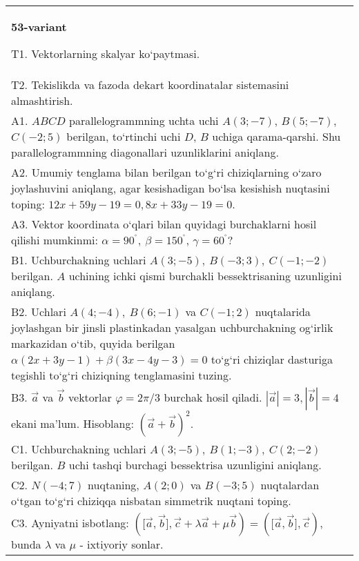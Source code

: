 \documentclass{article}
\begin{document}
\begin{tabular}{m{17cm}}
\textbf{53-variant}
\newline

T1. 
Vektorlarning skalyar ko‘paytmasi.
 \\
T2. Tekislikda va fazoda dekart koordinatalar sistemasini almashtirish.
 \\
A1. 
$ABCD$ parallelogrammning uchta uchi $A (3; -7) $,
$B (5; -7) $, $C (-2; 5) $ berilgan, to‘rtinchi uchi $D$,
$B$ uchiga qarama-qarshi. Shu parallelogrammning diagonallari
uzunliklarini aniqlang.
 \\
A2. 
Umumiy tenglama bilan berilgan to‘g‘ri chiziqlarning
o‘zaro joylashuvini aniqlang, agar kesishadigan bo‘lsa kesishish nuqtasini
toping: $12x+59y-19=0, 8x+33y-19=0$.
 \\
A3. 
Vektor koordinata o‘qlari bilan quyidagi burchaklarni hosil qilishi
mumkinmi: $\alpha = 90^{{^\circ}},\ \beta = 150^{{^\circ}}$,
$\gamma = 60^{{^\circ}}?$
 \\
B1. 
Uchburchakning uchlari
\(A (3;-5),\ B (-3;3),\ C (-1;-2) \) berilgan. $A$ uchining ichki qismi
burchakli bessektrisaning uzunligini aniqlang.
 \\
B2. 
Uchlari \(A (4;-4),\ B (6;-1) \) va \(C (-1;2) \)
nuqtalarida joylashgan bir jinsli plastinkadan yasalgan uchburchakning
og‘irlik markazidan o‘tib, quyida berilgan
\(\alpha (2x+3y-1) +\beta (3x-4y-3) =0\) to‘g‘ri chiziqlar dasturiga
tegishli to‘g‘ri chiziqning tenglamasini tuzing. \\
B3. 
$\vec{a}$ va $\vec{b}$ vektorlar $\varphi = 2\pi/3$ burchak hosil qiladi. $|\vec{a}| = 3,|\vec{b}| = 4$ ekani ma’lum. Hisoblang:
$ (\vec{a} + \vec{b}) ^{2}$.
 \\
C1. 
Uchburchakning uchlari
\(A (3; - 5),\ B (1; - 3),\ C (2; - 2) \) berilgan. $B$ uchi tashqi
burchagi bessektrisa uzunligini aniqlang.
 \\
C2. 
\(N (- 4; 7) \) nuqtaning, \(A (2;0) \) va \(B (- 3;5) \)
nuqtalardan o‘tgan to‘g‘ri chiziqqa nisbatan simmetrik nuqtani toping.
 \\
C3. 
Ayniyatni isbotlang: \((\lbrack\vec{a},\vec{b}\rbrack,\vec{c} + \lambda\vec{a} + \mu\vec{b}) = (\lbrack\vec{a},\vec{b}\rbrack,\vec{c}) \), bunda \(\lambda\) va \(\mu\) - ixtiyoriy sonlar. \\

\end{tabular}
\vspace{1cm}
\end{document}
